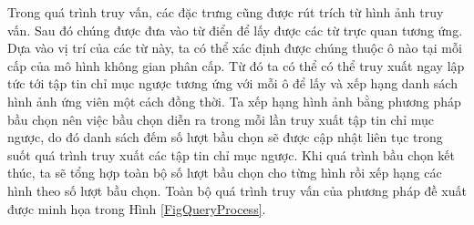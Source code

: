 Trong quá trình truy vấn, các đặc trưng cũng được rút trích từ hình ảnh truy vấn. Sau đó chúng được đưa vào từ điển để lấy được các từ trực quan tương ứng. Dựa vào vị trí của các từ này, ta có thể xác định được chúng thuộc ô nào tại mỗi cấp của mô hình không gian phân cấp. Từ đó ta có thể có thể truy xuất ngay lập tức tới tập tin chỉ mục ngược tương ứng với mỗi ô để lấy và xếp hạng danh sách hình ảnh ứng viên một cách đồng thời. Ta xếp hạng hình ảnh bằng phương pháp bầu chọn nên việc bầu chọn diễn ra trong mỗi lần truy xuất tập tin chỉ mục ngược, do đó danh sách đếm số lượt bầu chọn sẽ được cập nhật liên tục trong suốt quá trình truy xuất các tập tin chỉ mục ngược. Khi quá trình bầu chọn kết thúc, ta sẽ tổng hợp toàn bộ số lượt bầu chọn cho từng hình rồi xếp hạng các hình theo số lượt bầu chọn. Toàn bộ quá trình truy vấn của phương pháp đề xuất được minh họa trong Hình \ref{FigQueryProcess}.

